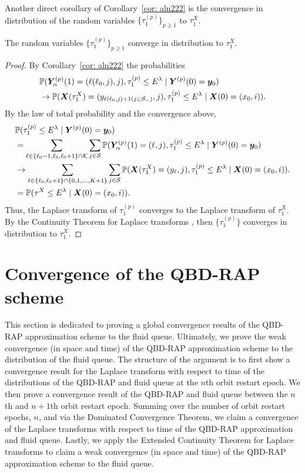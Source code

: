 Another direct corollary of Corollary~\ref{cor: aln222} is the convergence in distribution of the random variables \(\{\tau_1^{(p)}\}_{p\geq 1}\) to \(\tau_1^X\). 
\begin{cor}\label{cor: short cor}
	The random variables \(\{\tau_1^{(p)}\}_{p\geq 1}\) converge in distribution to \(\tau_1^X\). 
\end{cor}
\begin{proof}
	By Corollary~\ref{cor: aln222} the probabilities 
	\begin{align}
		&\mathbb P(\boldsymbol Y_{\alpha}^{(p)}(1) = (\ell(\ell_0,j),j),\tau_1^{(p)}\leq E^\lambda
            	 \mid \boldsymbol Y^{(p)}(0) = \boldsymbol y_0) \nonumber
		\\&\to  
			\mathbb P(\boldsymbol X(\tau_1^X) = (y_{\ell(\ell_0,j)+1(j\in\mathcal{S}_-)}, j),\tau_1^{(p)}\leq E^\lambda \mid \boldsymbol X(0) = (x_0,i)).\nonumber
	\end{align}
	By the law of total probability and the convergence above, 
	\begin{align}
		&\mathbb P( \tau_1^{(p)}\leq E^\lambda
		\mid \boldsymbol Y^{(p)}(0) = \boldsymbol y_0) \nonumber
		\\&=\sum_{\ell\in\{\ell_0-1,\ell_0,\ell_0+1\}\cap\mathcal K}\sum_{j\in\mathcal{S}}\mathbb P(\boldsymbol Y_{\alpha}^{(p)}(1) = (\ell,j),\tau_1^{(p)}\leq E^\lambda
		\mid \boldsymbol Y^{(p)}(0) = \boldsymbol y_0) \nonumber
		\\&\to  
		\sum_{\ell\in\{\ell_0,\ell_0+1\}\cap\{0,1,\dots,K+1\}}\sum_{j\in\mathcal{S}}\mathbb P(\boldsymbol X(\tau_1^X) = (y_{\ell}, j),\tau_1^{(p)}\leq E^\lambda \mid \boldsymbol X(0) = (x_0,i)).\nonumber
		\\&=\mathbb P(\tau^X\leq E^\lambda \mid \boldsymbol X(0) = (x_0,i) ).
	\end{align}
	Thus, the Laplace transform of \(\tau_1^{(p)}\) converges to the Laplace transform of \(\tau_1^X\). By the Continuity Theorem for Laplace transforms \cite[Chapter XIII, Theorem 2a]{feller1957}, then \(\{\tau_1^{(p)}\}\) converges in distribution to \(\tau_1^X\). 
\end{proof}

\section{Convergence of the QBD-RAP scheme}\label{sec: local to global}
This section is dedicated to proving a global convergence results of the QBD-RAP approximation scheme to the fluid queue. Ultimately, we prove the weak convergence (in space and time) of the QBD-RAP approximation scheme to the distribution of the fluid queue. The structure of the argument is to first show a convergence result for the Laplace transform with respect to time of the distributions of the QBD-RAP and fluid queue at the \(n\)th orbit restart epoch. We then prove a convergence result of the QBD-RAP and fluid queue between the \(n\)th and \(n+1\)th orbit restart epoch. Summing over the number of orbit restart epochs, \(n\), and via the Dominated Convergence Theorem, we claim a convergence of the Laplace transforms with respect to time of the QBD-RAP approximation and fluid queue. Lastly, we apply the Extended Continuity Theorem for Laplace transforms \cite[Chapter XIII, Theorem 2a]{feller1957} to claim a weak convergence (in space and time) of the QBD-RAP approximation scheme to the fluid queue.

